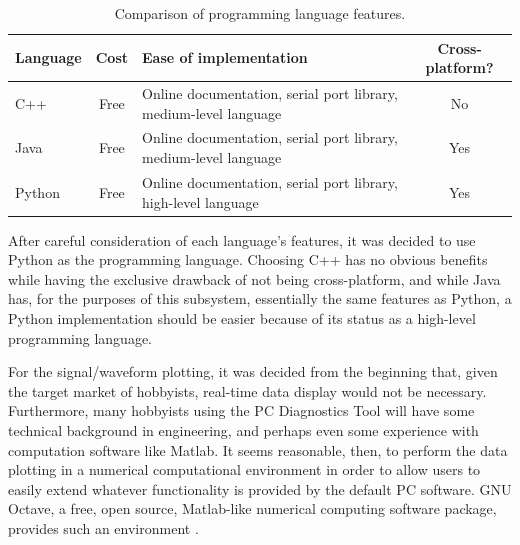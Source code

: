 \begin{table}[bhp]
\begin{tabular}{l | c | p{6cm} | c}
	Language & Cost & Ease of implementation & Cross-platform? \\ 
	\hline
	C++ & Free & Online documentation, serial port library, medium-level language \cite{web:cpptut}\cite{web:cppserial} & No \\ 
	\hline
	Java & Free & Online documentation, serial port library, medium-level language \cite{web:javaapi}\cite{web:javaserial} & Yes \\
	\hline
	Python & Free & Online documentation, serial port library, high-level language \cite{web:pydoc}\cite{web:pyserial} & Yes \\
\end{tabular}
\caption[Language features]{Comparison of programming language features.}
\label{tab:languages features}
\end{table}


After careful consideration of each language's features, it was decided to use Python as 
the programming language. Choosing C++ has no obvious benefits while having the exclusive 
drawback of not being cross-platform, and while Java has, for the purposes of this subsystem, 
essentially the same features as Python, a Python implementation should be easier because of 
its status as a high-level programming language.

For the signal/waveform plotting, it was decided from the beginning that, given the target 
market of hobbyists, real-time data display would not be necessary. Furthermore, many 
hobbyists using the PC Diagnostics Tool will have some technical background in engineering, 
and perhaps even some experience with computation software like Matlab. It seems reasonable, 
then, to perform the data plotting in a numerical computational environment in order to 
allow users to easily extend whatever functionality is provided by the default PC software. 
GNU Octave, a free, open source, Matlab-like numerical computing software package, provides 
such an environment \cite{web:octave}.


